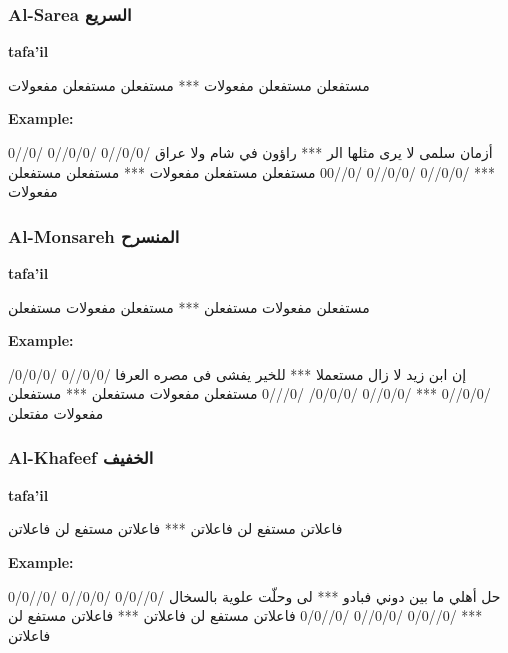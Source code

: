 \subsubsection{Al-Sarea \textarabic{السريع}}
\textbf{tafa'il}

\begin{Arabic}
  \begin{traditionalpoem*}
مستفعلن مستفعلن مفعولات *** مستفعلن مستفعلن مفعولات
	\end{traditionalpoem*}
      \end{Arabic}
\textbf{Example:}
\begin{Arabic}
\begin{traditionalpoem*}
أزمان سلمى لا يرى مثلها الر *** راؤون في شام ولا عراق
/0/0//0 /0/0//0 /0//0 *** /0/0//0 /0/0//0 /0//00
مستفعلن مستفعلن مفعولات *** مستفعلن مستفعلن مفعولات
\end{traditionalpoem*}
\end{Arabic}
\subsubsection{Al-Monsareh \textarabic{المنسرح}}
\textbf{tafa'il}
\begin{Arabic}
  \begin{traditionalpoem*}
مستفعلن مفعولات مستفعلن *** مستفعلن مفعولات مستفعلن
\end{traditionalpoem*}
\end{Arabic}
\textbf{Example:}
\begin{Arabic}
\begin{traditionalpoem*}
إن ابن زيد لا زال مستعملا *** للخير يفشى فى مصره العرفا
    /0/0//0 /0/0/0/ /0/0//0 *** /0/0//0 /0/0/0/ /0///0
    مستفعلن مفعولات مستفعلن *** مستفعلن مفعولات مفتعلن
\end{traditionalpoem*}
\end{Arabic}
\subsubsection{Al-Khafeef \textarabic{الخفيف}}
\textbf{tafa'il}
\begin{Arabic}
\begin{traditionalpoem*}
فاعلاتن مستفع لن فاعلاتن *** فاعلاتن مستفع لن فاعلاتن
	\end{traditionalpoem*}
      \end{Arabic}
\textbf{Example:}
\begin{Arabic}
\begin{traditionalpoem*}
حل أهلي ما بين دوني فبادو *** لى وحلّت علوية بالسخال
    /0//0/0 /0/0//0  /0//0/0 *** /0//0/0 /0/0//0 /0//0/0
    فاعلاتن مستفع لن فاعلاتن *** فاعلاتن مستفع لن فاعلاتن
\end{traditionalpoem*}
\end{Arabic}
